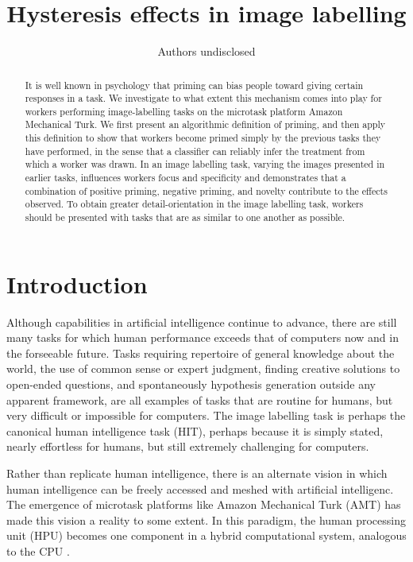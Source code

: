 \documentclass[letterpaper]{article}
\title{Hysteresis effects in image labelling}
\author{Authors undisclosed}
\begin{document}
\maketitle



\begin{abstract}
	It is well known in psychology that priming can bias people toward giving
	certain responses in a task.  We investigate to what extent this mechanism 
	comes into play for workers performing image-labelling tasks on the
	microtask platform Amazon Mechanical Turk.  
	We first present an algorithmic definition of priming, and then apply this
	definition to show that workers become primed simply by the previous 
	tasks they have performed, in the sense that a classifier can reliably
	infer the treatment from which a worker was drawn.
	In an image labelling task, varying the images presented in earlier tasks, 
	influences workers focus and specificity
	and demonstrates that a combination of positive priming, negative priming,
	and novelty contribute to the effects observed.
	To obtain greater detail-orientation in the image labelling task, 
	workers should be presented with
	tasks that are as similar to one another as possible.
\end{abstract}
\textbf{}
\section*{Introduction}

Although capabilities in artificial intelligence continue to advance, 
there are still many tasks for which human performance exceeds that of 
computers now and in the forseeable future.  Tasks requiring repertoire of 
general knowledge about the world, the use of common sense or expert judgment, 
finding creative solutions to open-ended questions, and spontaneously 
hypothesis generation outside any apparent framework, are all examples of 
tasks that are routine for humans, but very difficult or impossible for 
computers.  The image labelling task is perhaps the canonical human 
intelligence task (HIT), perhaps because it is simply stated, nearly effortless
for humans, but still extremely challenging for computers.

Rather than replicate human intelligence, there is an alternate vision in 
which human intelligence can be freely accessed and meshed with artificial
intelligenc.  The emergence of microtask platforms like Amazon Mechanical 
Turk (AMT) has made this vision a reality to some extent.  In this paradigm,
the human processing unit (HPU) becomes one component in a hybrid 
computational system, analogous to the CPU \cite{5543192}.
\end{document}
